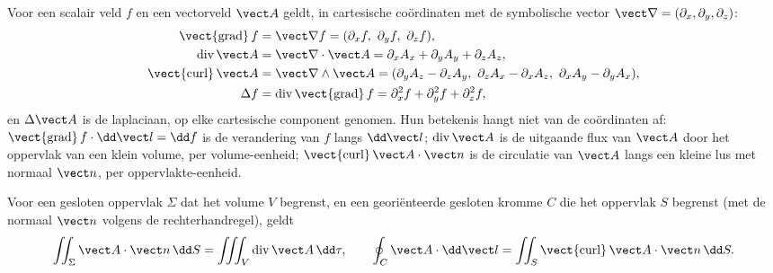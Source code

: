 \begin{definition}\label{def:b2:maxwell-equations:operators}
Voor een scalair veld $f$ en een vectorveld $\vect A$ geldt, in cartesische
coördinaten met de symbolische vector
$\vect\nabla = (\partial_x, \partial_y,
\partial_z)$:
\begin{align*}
\operatorname{\vect{grad}}f &= \vect\nabla f = (\partial_xf,\ \partial_yf,\ \partial_zf) ,\\
\operatorname{div}\vect A &= \vect\nabla\cdot\vect A = \partial_xA_x + \partial_yA_y + \partial_zA_z ,\\
\operatorname{\vect{curl}}\vect A &= \vect\nabla\wedge\vect A = (\partial_yA_z - \partial_zA_y,\ \partial_zA_x - \partial_xA_z,\ \partial_xA_y - \partial_yA_x) ,\\
\Delta f &= \operatorname{div}\operatorname{\vect{grad}}f = \partial_x^2f + \partial_y^2f + \partial_z^2f ,
\end{align*}
en $\Delta\vect A$ is de laplaciaan, op elke cartesische component genomen.
Hun betekenis hangt niet van de coördinaten af:
$\operatorname{\vect{grad}}f
\cdot\dd\vect l = \dd f$ is de verandering van
$f$ langs $\dd\vect l$; $\operatorname{div}
\vect A$ is de uitgaande flux
van $\vect A$ door het oppervlak van een klein volume, per volume-eenheid;
$\operatorname{\vect{curl}}\vect A\cdot\vect n$ is de circulatie van
$\vect A$ langs een kleine lus met normaal $\vect n$, per
oppervlakte-eenheid.
\end{definition}

\begin{theorem}\label{thm:b2:maxwell-equations:theorems}
Voor een gesloten oppervlak $\Sigma$ dat het volume $V$ begrenst, en een
georiënteerde gesloten kromme $C$ die het oppervlak $S$ begrenst (met de
normaal $\vect n$ volgens de rechterhandregel), geldt
\[
\iint_\Sigma\vect A\cdot\vect n\,\dd S = \iiint_V\operatorname{div}\vect A\,\dd\tau ,
\qquad
\oint_C\vect A\cdot\dd\vect l = \iint_S\operatorname{\vect{curl}}\vect A\cdot\vect n\,\dd S .
\]
\end{theorem}
\admitted

